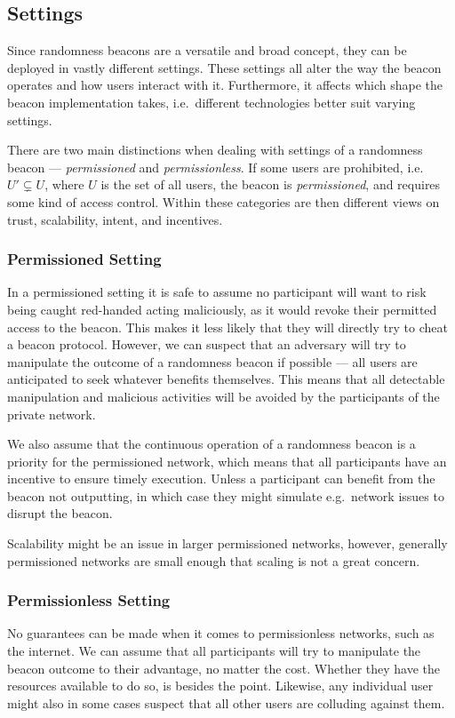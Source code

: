 \subsection{Settings}
Since randomness beacons are a versatile and broad concept, they can be deployed in vastly different settings.
These settings all alter the way the beacon operates and how users interact with it.
Furthermore, it affects which shape the beacon implementation takes, i.e.\ different technologies better suit varying settings.

There are two main distinctions when dealing with settings of a randomness beacon --- \emph{permissioned} and \emph{permissionless}. If some users are prohibited, i.e.\ $U' \subsetneq U$, where $U$ is the set of all users, the beacon is \emph{permissioned}, and requires some kind of access control.
Within these categories are then different views on trust, scalability, intent, and incentives.

\subsubsection{Permissioned Setting}
In a permissioned setting it is safe to assume no participant will want to risk being caught red-handed acting maliciously, as it would revoke their permitted access to the beacon.
This makes it less likely that they will directly try to cheat a beacon protocol.
However, we can suspect that an adversary will try to manipulate the outcome of a randomness beacon if possible --- all users are anticipated to seek whatever benefits themselves.
This means that all detectable manipulation and malicious activities will be avoided by the participants of the private network.

We also assume that the continuous operation of a randomness beacon is a priority for the permissioned network, which means that all participants have an incentive to ensure timely execution.
Unless a participant can benefit from the beacon not outputting, in which case they might simulate e.g.\ network issues to disrupt the beacon.

Scalability might be an issue in larger permissioned networks, however, generally permissioned networks are small enough that scaling is not a great concern.

\subsubsection{Permissionless Setting}
No guarantees can be made when it comes to permissionless networks, such as the internet.
We can assume that all participants will try to manipulate the beacon outcome to their advantage, no matter the cost.
Whether they have the resources available to do so, is besides the point.
Likewise, any individual user might also in some cases suspect that all other users are colluding against them.


